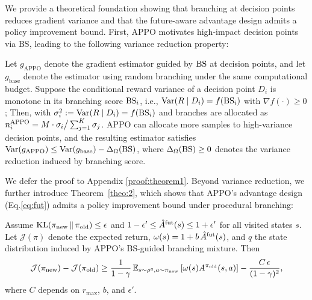 \documentclass{llmxive}
\begin{document}
We provide a theoretical foundation showing that branching at decision points reduces gradient variance and that the future-aware advantage design admits a policy improvement bound. First, APPO motivates high-impact decision points via BS, leading to the following variance reduction property:
\vspace{-0.1cm}
\begin{theorem}\label{theo:1}
Let $g_{\mathrm{APPO}}$ denote the gradient estimator guided by ${\rm BS}$ at decision points, and let $g_{\mathrm{base}}$ denote the estimator using random branching under the same computational budget. Suppose the conditional reward variance of a decision point $D_i$ is monotone in its branching score ${\rm BS}_i$, i.e., $\mathrm{Var}(R\mid D_i)=f({\rm BS}_i)$ with $\nabla f(\cdot)\ge 0$; Then, with $\sigma_i^2 := \mathrm{Var}(R \mid D_i) = f({\rm BS}_i)$ and branches are allocated as $n^{\rm APPO}_i= M \cdot \sigma_i \big/ \sum_{j=1}^K \sigma_j$. APPO can allocate more samples to high-variance decision points, and the resulting estimator satisfies $\mathrm{Var}(g_{\mathrm{APPO}})\le \mathrm{Var}(g_{\mathrm{base}})-\Delta_\Omega({\rm BS})$, where $\Delta_\Omega({\rm BS})\ge 0$ denotes the variance reduction induced by branching score.  
\end{theorem}
\vspace{-0.1cm}
We defer the proof to Appendix \ref{proof:theorem1}. Beyond variance reduction, we further introduce Theorem~\ref{theo:2}, which shows that APPO's advantage design (Eq.\ref{eq:fut})  admits a policy improvement bound under procedural branching:
\vspace{-0.1cm}
\begin{theorem}\label{theo:2}
Assume $\mathrm{KL}(\pi_{\rm new}\,\|\,\pi_{\rm old})\le \epsilon$ and $1-\epsilon' \le \hat{A}^{\rm fut}(s)\le 1+\epsilon'$ for all visited states $s$. Let $\mathcal{J}(\pi)$ denote the expected return, $\omega(s)=1+b\,\hat{A}^{\rm fut}(s)$,
and $q$ the state distribution induced by APPO's BS-guided branching mixture. Then
\begin{equation}
    \mathcal{J}(\pi_{\rm new}) - \mathcal{J}(\pi_{\rm old})
    \ge \frac{1}{1-\gamma}\,
    \mathbb{E}_{s \sim \rho^{q}, a \sim \pi_{\rm new}}
    \left[ \omega(s) A^{\pi_{\rm old}}(s, a) \right]
    - \frac{C\,\epsilon}{(1-\gamma)^2},
\end{equation}
where $C$ depends on $r_{\max}$, $b$, and $\epsilon'$.
\end{theorem}
\end{document}
